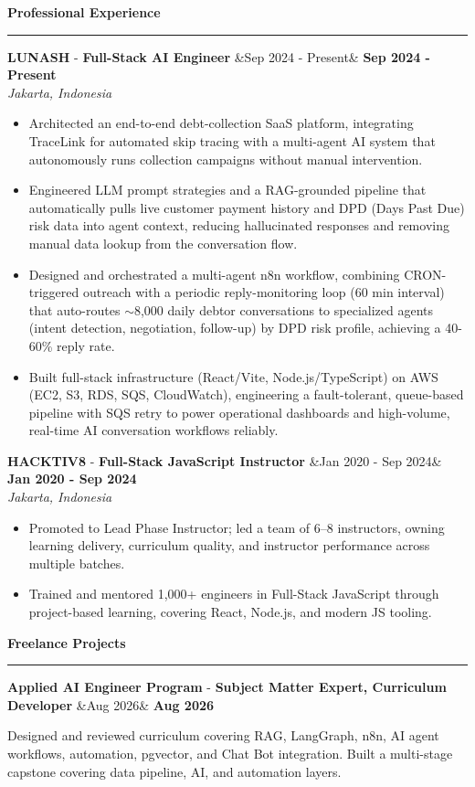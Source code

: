 \documentclass{article}
\newcommand{\header}[1]{
	\vspace{2.5mm}
	{\large \noindent \textcolor[HTML]{19598C}{\textbf{#1}}}
	\vspace{0.5mm}
	\hrule
	\vspace{1.5mm}
}
\newcommand{\longitem}[4]{
	\begin{adjustwidth}{}{}
		\MakeUppercase{\textbf{#1}} - \textbf{#3} \hfill \ifx&#2& \else \textbf{#2} \fi \\ \textit{#4} \\
	\end{adjustwidth}
	\vspace{-1mm}
}
\newcommand{\projectitem}[4]{
	\begin{adjustwidth}{}{}
		\textbf{#1} - \textbf{#3} \hfill \ifx&#2& \else \textbf{#2} \fi \\
	\end{adjustwidth}
	\vspace{-1mm}
}
\newcommand{\liststart}{\begin{itemize}[leftmargin=*]\leftskip=0.2em\vspace{-5mm}}
\newcommand{\listend}{\end{itemize}}
\newcommand{\textstart}{\begin{adjustwidth}{}{}\vspace{-4mm}}
\newcommand{\textend}{\end{adjustwidth}\vspace{0.2mm}}
\begin{document}
	\header{Professional Experience}
		\longitem{Lunash}{Sep 2024 - Present}{Full-Stack AI Engineer}{Jakarta, Indonesia}
		\liststart
		\item Architected an end-to-end debt-collection SaaS platform, integrating TraceLink for automated skip tracing with a multi-agent AI system that autonomously runs collection campaigns without manual intervention. \vspace{-1mm}
		\item Engineered LLM prompt strategies and a RAG-grounded pipeline that automatically pulls live customer payment history and DPD (Days Past Due) risk data into agent context, reducing hallucinated responses and removing manual data lookup from the conversation flow. \vspace{-1mm}
		\item Designed and orchestrated a multi-agent n8n workflow, combining CRON-triggered outreach with a periodic reply-monitoring loop (60 min interval) that auto-routes $\sim$8,000 daily debtor conversations to specialized agents (intent detection, negotiation, follow-up) by DPD risk profile, achieving a 40-60\% reply rate. \vspace{-1mm}
		\item Built full-stack infrastructure (React/Vite, Node.js/TypeScript) on AWS (EC2, S3, RDS, SQS, CloudWatch), engineering a fault-tolerant, queue-based pipeline with SQS retry to power operational dashboards and high-volume, real-time AI conversation workflows reliably.
		\listend\vspace{0.2mm}
		
		\longitem{Hacktiv8}{Jan 2020 - Sep 2024}{Full-Stack JavaScript Instructor}{Jakarta, Indonesia}
		\liststart
			\item Promoted to Lead Phase Instructor; led a team of 6--8 instructors, owning learning delivery, curriculum quality, and instructor performance across multiple batches. \vspace{-1mm}
			\item Trained and mentored 1{,}000+ engineers in Full-Stack JavaScript through project-based learning, covering React, Node.js, and modern JS tooling.
		\listend\vspace{-1mm}

	\header{Freelance Projects}
		\projectitem{Applied AI Engineer Program}{Aug 2026}{Subject Matter Expert, Curriculum Developer}{}
		\textstart
			Designed and reviewed curriculum covering RAG, LangGraph, n8n, AI agent workflows, automation, pgvector, and Chat Bot integration. Built a multi-stage capstone covering data pipeline, AI, and automation layers.
		\textend
\end{document}
